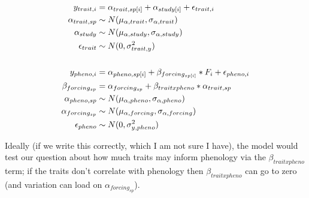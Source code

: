 \documentclass[11pt,letter]{article}
\begin{document}
\begin{align*}
y_{trait, i} &= \alpha_{trait, sp[i]} + \alpha_{study[i]} + \epsilon_{trait, i}\\
\alpha_{trait, sp} & \sim N(\mu_{\alpha, trait}, \sigma_{\alpha, trait}) \\
\alpha_{study}  & \sim N(\mu_{\alpha, study}, \sigma_{\alpha, study})\\
\epsilon_{trait} & \sim N(0,\sigma^2_{trait, y}) \\
\vspace{1ex}\\
y_{pheno, i} &= \alpha_{pheno, sp[i]} + \beta_{forcing_{sp[i]}}*F_i + \epsilon_{pheno, i}\\
\beta_{forcing_{sp}} & = \alpha_{forcing_{sp}} + \beta_{trait x pheno}*\alpha_{trait, sp} \\
\alpha_{pheno, sp} & \sim N(\mu_{\alpha, pheno}, \sigma_{\alpha, pheno}) \\
\alpha_{forcing_{sp}} & \sim N(\mu_{\alpha, forcing}, \sigma_{\alpha, forcing})\\
\epsilon_{pheno} & \sim N(0,\sigma^2_{y, pheno}) 
\end{align*}

Ideally (if we write this correctly, which I am not sure I have), the model would test our question about how much traits may inform phenology via the $\beta_{trait x pheno}$ term; if the traits don't correlate with phenology then $\beta_{trait x pheno}$ can go to zero (and variation can load on $\alpha_{forcing_{sp}}$).
\end{document}
